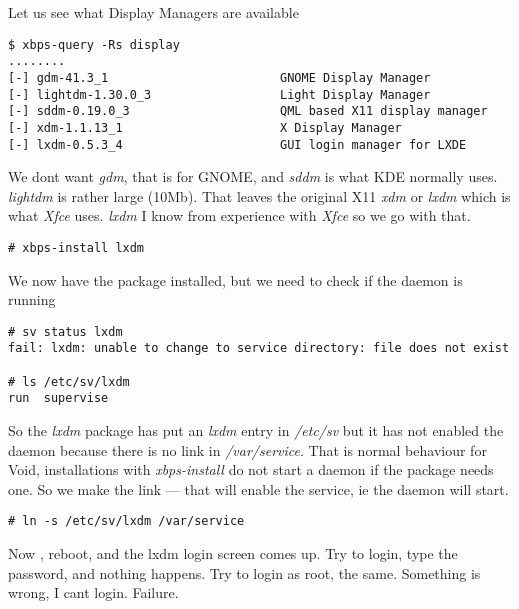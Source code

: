 \documentclass{article}  %
\begin{document}
Let us see what Display Managers are available
\begin{verbatim}
$ xbps-query -Rs display
........
[-] gdm-41.3_1                        GNOME Display Manager
[-] lightdm-1.30.0_3                  Light Display Manager
[-] sddm-0.19.0_3                     QML based X11 display manager
[-] xdm-1.1.13_1                      X Display Manager
[-] lxdm-0.5.3_4                      GUI login manager for LXDE
\end{verbatim}
We dont want {\em gdm}, that is for GNOME, and {\em sddm} is what KDE normally uses. {\em lightdm} is rather large (10Mb). That leaves the original X11 {\em xdm} or {\em lxdm} which is what {\em Xfce} uses. {\em lxdm} I know from experience with {\em Xfce} so we go with that.
\begin{verbatim}
# xbps-install lxdm
\end{verbatim}
We now have the package installed, but we need to check if the daemon is running 
\begin{verbatim}
# sv status lxdm
fail: lxdm: unable to change to service directory: file does not exist

# ls /etc/sv/lxdm
run  supervise
\end{verbatim}
So the {\em lxdm} package has put an {\em lxdm} entry in {\em /etc/sv} but it has not enabled the daemon because there is no link in {\em /var/service}. That is normal behaviour for Void, installations with {\em xbps-install} do not start a daemon if the package needs one.   So we make the link --- that will enable the service, ie the daemon will start.
\begin{verbatim}
# ln -s /etc/sv/lxdm /var/service
\end{verbatim}
Now , reboot, and the lxdm login screen comes up. Try to login, type the password, and nothing happens. Try to login as root, the same.  Something is wrong, I cant login. Failure.
\end{document}
